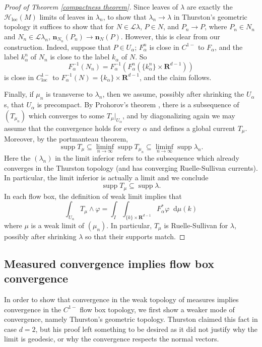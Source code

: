 \documentclass[reqno,11pt]{amsart}
\newcommand{\RR}{\mathbf{R}}
\newcommand*\dif{\mathop{}\!\mathrm{d}}
\DeclareMathOperator{\supp}{supp}
\newcommand{\Leaves}{\mathscr L}
\newcommand{\Hypspace}{\mathscr H}
\newcommand{\normal}{\mathbf n}
\newcommand{\loc}{\mathrm{loc}}
\theoremstyle{definition}
\numberwithin{equation}{section}
\begin{document}
\begin{proof}[Proof of Theorem \ref{compactness theorem}]
Since leaves of $\lambda$ are exactly the $\Hypspace_\loc(M)$ limits of leaves in $\lambda_n$, to show that $\lambda_n \to \lambda$ in Thurston's geometric topology it suffices to show that for $N \in \Leaves \lambda$, $P \in N$, and $P_n \to P$, where $P_n \in N_n$ and $N_n \in \Leaves \lambda_n$, $\normal_{N_n}(P_n) \to \normal_N(P)$.
However, this is clear from our construction.
Indeed, suppose that $P \in U_\alpha$; $F_\alpha^n$ is close in $C^{1-}$ to $F_\alpha$, and the label $k^n_\alpha$ of $N_n$ is close to the label $k_\alpha$ of $N$.
So
$$F_\alpha^{-1}(N_n) = F_\alpha^{-1}(F_\alpha^n(\{k_\alpha^n\} \times \RR^{d - 1}))$$
is close in $C^{1-}_\loc$ to $F_\alpha^{-1}(N) = \{k_\alpha\} \times \RR^{d - 1}$, and the claim follows.

Finally, if $\mu_n$ is transverse to $\lambda_n$, then we assume, possibly after shrinking the $U_\alpha$s, that $U_\alpha$ is precompact.
By Prohorov's theorem \cite[Theorem 13.29]{klenke2013probability}, there is a subsequence of $(T_{\mu_n})$ which converges to some $T_\mu|_{U_\alpha}$, and by diagonalizing again we may assume that the convergence holds for every $\alpha$ and defines a global current $T_\mu$.
Moreover, by the portmanteau theorem,
$$\supp T_\mu \subseteq \liminf_{n \to \infty} \supp T_{\mu_n} \subseteq \liminf_{n \to \infty} \supp \lambda_n.$$
Here the $(\lambda_n)$ in the limit inferior refers to the subsequence which already converges in the Thurston topology (and has converging Ruelle-Sullivan currents).
In particular, the limit inferior is actually a limit and we conclude
$$\supp T_\mu \subseteq \supp \lambda.$$
In each flow box, the definition of weak limit implies that
$$\int_{U_\alpha} T_\mu \wedge \varphi = \int_I \int_{\{k\} \times \RR^{d - 1}} F_\alpha^* \varphi \dif \mu(k)$$
where $\mu$ is a weak limit of $(\mu_n)$.
In particular, $T_\mu$ is Ruelle-Sullivan for $\lambda$, possibly after shrinking $\lambda$ so that their supports match.
\end{proof}

\subsection{Measured convergence implies flow box convergence}
In order to show that convergence in the weak topology of measures implies convergence in the $C^{1-}$ flow box topology, we first show a weaker mode of convergence, namely Thurston's geometric topology.
Thurston claimed this fact \cite[Proposition 8.10.3]{thurston1979geometry} in case $d = 2$, but his proof left something to be desired as it did not justify why the limit is geodesic, or why the convergence respects the normal vectors.
\end{document}
